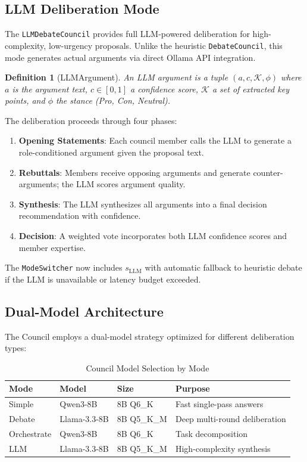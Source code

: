 \documentclass[11pt]{article}
\newtheorem{definition}{Definition}
\begin{document}
\subsection{LLM Deliberation Mode}

The \texttt{LLMDebateCouncil} provides full LLM-powered deliberation for
high-complexity, low-urgency proposals. Unlike the heuristic \texttt{DebateCouncil},
this mode generates actual arguments via direct Ollama API integration.

\begin{definition}[LLMArgument]
An \emph{LLM argument} is a tuple $(a, c, \mathcal{K}, \phi)$ where $a$ is the
argument text, $c \in [0,1]$ a confidence score, $\mathcal{K}$ a set of extracted
key points, and $\phi$ the stance (Pro, Con, Neutral).
\end{definition}

The deliberation proceeds through four phases:
\begin{enumerate}[noitemsep,topsep=4pt]
  \item \textbf{Opening Statements}: Each council member calls the LLM to generate
        a role-conditioned argument given the proposal text.
  \item \textbf{Rebuttals}: Members receive opposing arguments and generate
        counter-arguments; the LLM scores argument quality.
  \item \textbf{Synthesis}: The LLM synthesizes all arguments into a final
        decision recommendation with confidence.
  \item \textbf{Decision}: A weighted vote incorporates both LLM confidence scores
        and member expertise.
\end{enumerate}

The \texttt{ModeSwitcher} now includes $s_{\text{LLM}}$ with automatic fallback
to heuristic debate if the LLM is unavailable or latency budget exceeded.

\subsection{Dual-Model Architecture}

The Council employs a dual-model strategy optimized for different deliberation
types:

\begin{table}[H]
\centering
\caption{Council Model Selection by Mode}
\label{tab:council_models}
\small
{}
\begin{tabular}{llp{2.5cm}p{4cm}}
\toprule
\textbf{Mode} & \textbf{Model} & \textbf{Size} & \textbf{Purpose} \\
\midrule
Simple & Qwen3-8B & 8B Q6\_K & Fast single-pass answers \\
Debate & Llama-3.3-8B & 8B Q5\_K\_M & Deep multi-round deliberation \\
Orchestrate & Qwen3-8B & 8B Q6\_K & Task decomposition \\
LLM & Llama-3.3-8B & 8B Q5\_K\_M & High-complexity synthesis \\
\bottomrule
\end{tabular}
\end{table}
\end{document}
